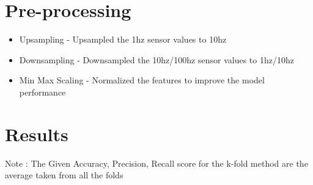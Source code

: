 \documentclass{article}
\begin{document}
\section{Pre-processing}
\begin{itemize}
    \item Upsampling - Upsampled the 1hz sensor values to 10hz
    \item Downsampling - Downsampled the 10hz/100hz sensor values to 1hz/10hz
    \item Min Max Scaling - Normalized the features to improve the model performance
\end{itemize}





\section{Results}
Note : The Given Accuracy, Precision, Recall score for the k-fold method are the average taken from all the folds
\end{document}
